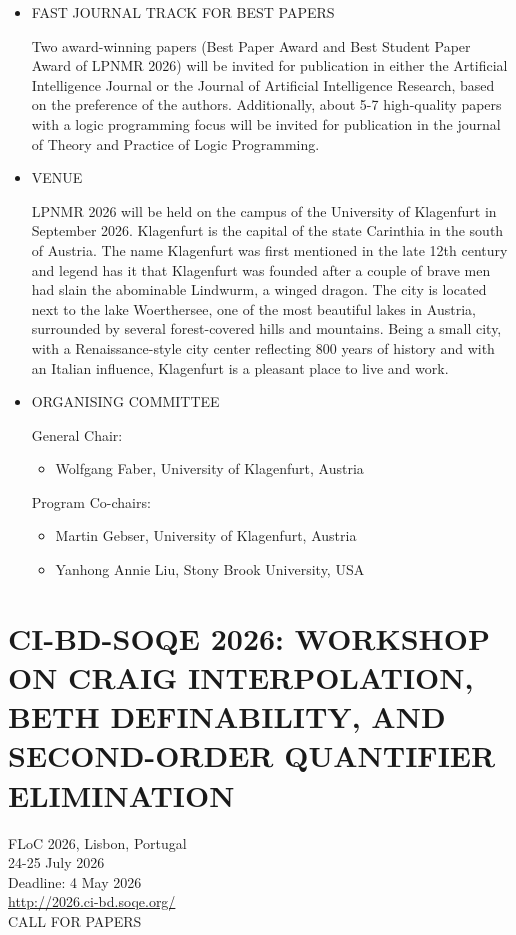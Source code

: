 \documentclass[prodmode,acmtecs]{acmsmall} %
\begin{document}
\begin{itemize}
  LPNMR 2026 will not accept any paper which, at the time of submission, is under review or has already been published or accepted for publication in a journal or another conference. Authors are also required not to submit their papers elsewhere during LPNMR's review period. However, these restrictions do not apply to workshops (e.g., ASPOCP 2026) with a limited audience and without archival proceedings. 
 
\item  FAST JOURNAL TRACK FOR BEST PAPERS 
 
  Two award-winning papers (Best Paper Award and Best Student Paper Award of LPNMR 2026) will be invited for publication in either the Artificial Intelligence Journal or the Journal of Artificial Intelligence Research, based on the preference of the authors. Additionally, about 5-7 high-quality papers with a logic programming focus will be invited for publication in the journal of Theory and Practice of Logic Programming. 
 
\item  VENUE 
 
  LPNMR 2026 will be held on the campus of the University of Klagenfurt in September 2026. Klagenfurt is the capital of the state Carinthia in the south of Austria. The name Klagenfurt was first mentioned in the late 12th century and legend has it that Klagenfurt was founded after a couple of brave men had slain the abominable Lindwurm, a winged dragon. The city is located next to the lake Woerthersee, one of the most beautiful lakes in Austria, surrounded by several forest-covered hills and mountains. Being a small city, with a Renaissance-style city center reflecting 800 years of history and with an Italian influence, Klagenfurt is a pleasant place to live and work. 
 
\item  ORGANISING COMMITTEE 
 
  General Chair: 
 
\begin{itemize}\item  Wolfgang Faber, University of Klagenfurt, Austria
\end{itemize} 
  Program Co-chairs: 
 
\begin{itemize}\item  Martin Gebser, University of Klagenfurt, Austria
\item  Yanhong Annie Liu, Stony Brook University, USA
\end{itemize} 
\end{itemize}\section{CI-BD-SOQE 2026: WORKSHOP ON CRAIG INTERPOLATION, BETH DEFINABILITY, AND SECOND-ORDER QUANTIFIER ELIMINATION}\label{CIBDSOQE2026}  FLoC 2026, Lisbon, Portugal\\ 
  24-25 July 2026\\ 
  Deadline: 4 May 2026\\ 
  \href{http://2026.ci-bd.soqe.org/}{http://2026.ci-bd.soqe.org/}\\ 
CALL FOR PAPERS 
\end{document}
